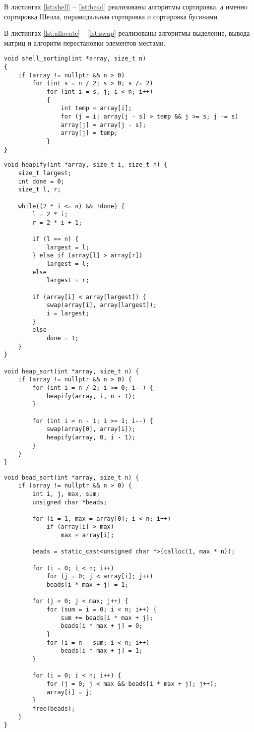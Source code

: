 В листингах \ref{lst:shell} -- \ref{lst:bead} реализованы алгоритмы сортировка, а именно сортировка Шелла, пирамидальная сортировка и сортировка бусинами.

В листингах \ref{lst:allocate} -- \ref{lst:swap} реализованы алгоритмы выделение, вывода матриц и алгоритм перестановки элементов местами.

\clearpage

\begin{lstlisting}[label=lst:shell,caption=Функция сортировки методом Шелла]
void shell_sorting(int *array, size_t n)
{
	if (array != nullptr && n > 0)
		for (int s = n / 2; s > 0; s /= 2)
			for (int i = s, j; i < n; i++)
			{
				int temp = array[i];
				for (j = i; array[j - s] > temp && j >= s; j -= s)
				array[j] = array[j - s];
				array[j] = temp;
			}
}
\end{lstlisting}

\clearpage

\begin{lstlisting}[label=lst:heap,caption=Функция пирамидальной сортировки]
void heapify(int *array, size_t i, size_t n) {
	size_t largest;
	int done = 0;
	size_t l, r;
	
	while((2 * i <= n) && !done) {
		l = 2 * i;
		r = 2 * i + 1;
		
		if (l == n) {
			largest = l;
		} else if (array[l] > array[r])
			largest = l;
		else
			largest = r;
		
		if (array[i] < array[largest]) {
			swap(array[i], array[largest]);
			i = largest;
		}
		else
			done = 1;
	}
}

void heap_sort(int *array, size_t n) {
	if (array != nullptr && n > 0) {
		for (int i = n / 2; i >= 0; i--) {
			heapify(array, i, n - 1);
		}
		
		for (int i = n - 1; i >= 1; i--) {
			swap(array[0], array[i]);
			heapify(array, 0, i - 1);
		}
	}
}
\end{lstlisting}

\clearpage

\begin{lstlisting}[label=lst:bead,caption=Функция сортировки бусинами]
void bead_sort(int *array, size_t n) {
	if (array != nullptr && n > 0) {
		int i, j, max, sum;
		unsigned char *beads;
		
		for (i = 1, max = array[0]; i < n; i++)
			if (array[i] > max)
				max = array[i];
		
		beads = static_cast<unsigned char *>(calloc(1, max * n));
		
		for (i = 0; i < n; i++)
			for (j = 0; j < array[i]; j++)
			beads[i * max + j] = 1;
		
		for (j = 0; j < max; j++) {
			for (sum = i = 0; i < n; i++) {
				sum += beads[i * max + j];
				beads[i * max + j] = 0;
			}
			for (i = n - sum; i < n; i++)
				beads[i * max + j] = 1;
		}
		
		for (i = 0; i < n; i++) {
			for (j = 0; j < max && beads[i * max + j]; j++);
			array[i] = j;
		}
		free(beads);
	}
}
\end{lstlisting}

